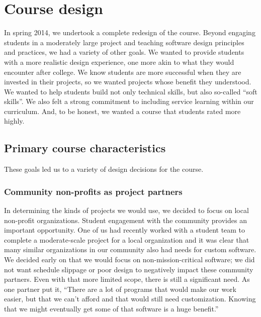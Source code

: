 \section{Course design}


In spring 2014, we undertook a complete redesign of the course.
Beyond engaging students in a moderately large project and teaching
software design principles and practices, we had a variety of other
goals.  We wanted to provide students with a more realistic design
experience, one more akin to what they would encounter after college.
We know students are more successful when they are invested in their
projects, so we wanted projects whose benefit they understood.  We
wanted to help students build not only technical skills, but also
so-called ``soft skills''.  We also felt a strong commitment to
including service learning within our curriculum.  And, to be
honest, we wanted a course that students rated more highly.

\subsection{Primary course characteristics}

These goals led us to a variety of design decisions for the course.

\subsubsection{Community non-profits as project partners}

In determining the kinds of projects we would use, we decided to
focus on local non-profit organizations.  Student engagement with
the community provides an important opportunity.  One of us had
recently worked with a student team to complete a moderate-scale
project for a local organization and it was clear that many similar
organizations in our community also had needs for custom software.
We decided early on that we would focus on non-mission-critical
software; we did not want schedule slippage or poor design to
negatively impact these community partners.  Even with that more
limited scope, there is still a significant need.  As one partner
put it, ``There are a lot of programs that would make our work
easier, but that we can't afford and that would still need
customization.  Knowing that we might eventually get some of that
software is a huge benefit.''

